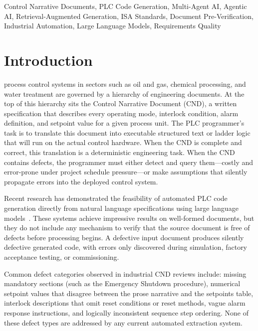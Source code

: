 \documentclass[journal]{IEEEtran}
\begin{document}
\begin{IEEEkeywords}
Control Narrative Documents, PLC Code Generation, Multi-Agent AI, Agentic AI,
Retrieval-Augmented Generation, ISA Standards, Document Pre-Verification,
Industrial Automation, Large Language Models, Requirements Quality
\end{IEEEkeywords}

\section{Introduction}
\label{sec:intro}

 process control systems in sectors such as oil and
gas, chemical processing, and water treatment are governed by a hierarchy of
engineering documents. At the top of this hierarchy sits the Control Narrative
Document (CND), a written specification that describes every operating mode,
interlock condition, alarm definition, and setpoint value for a given process
unit. The PLC programmer's task is to translate this document into executable
structured text or ladder logic that will run on the actual control hardware.
When the CND is complete and correct, this translation is a deterministic
engineering task. When the CND contains defects, the programmer must either
detect and query them---costly and error-prone under project schedule
pressure---or make assumptions that silently propagate errors into the deployed
control system.

Recent research has demonstrated the feasibility of automated PLC code
generation directly from natural language specifications using large language
models~\cite{koziolek2023,koziolek2024rag,kunze2025}. These systems achieve
impressive results on well-formed documents, but they do not include any
mechanism to verify that the source document is free of defects before
processing begins. A defective input document produces silently defective
generated code, with errors only discovered during simulation, factory
acceptance testing, or commissioning.

Common defect categories observed in industrial CND reviews include: missing
mandatory sections (such as the Emergency Shutdown procedure), numerical
setpoint values that disagree between the prose narrative and the setpoints
table, interlock descriptions that omit reset conditions or reset methods, vague
alarm response instructions, and logically inconsistent sequence step ordering.
None of these defect types are addressed by any current automated extraction
system.
\end{document}
